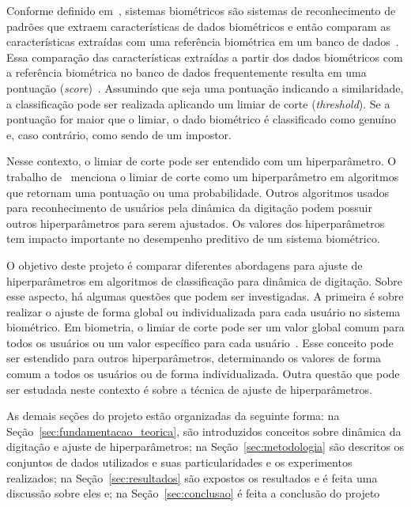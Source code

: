 Conforme definido em~\cite{Jain2004_IntroToBiometrics}, sistemas biométricos são sistemas de reconhecimento de padrões que extraem características de dados biométricos e então comparam as características extraídas com uma referência biométrica em um banco de dados~\cite{Jain2004_IntroToBiometrics}. Essa comparação das características extraídas a partir dos dados biométricos com a referência biométrica no banco de dados frequentemente resulta em uma pontuação (\textit{score})~\cite{Jain2016_50Years}. Assumindo que seja uma pontuação indicando a similaridade, a classificação pode ser realizada aplicando um limiar de corte (\textit{threshold}). Se a pontuação for maior que o limiar, o dado biométrico é classificado como genuíno e, caso contrário, como sendo de um impostor.

Nesse contexto, o limiar de corte pode ser entendido com um hiperparâmetro. O trabalho de~\cite{hpo_foundations_algorithms_and_open_challenges} menciona o limiar de corte como um hiperparâmetro em algoritmos que retornam uma pontuação ou uma probabilidade. Outros algoritmos usados para reconhecimento de usuários pela dinâmica da digitação podem possuir outros hiperparâmetros para serem ajustados. Os valores dos hiperparâmetros tem impacto importante no desempenho preditivo de um sistema biométrico.

O objetivo deste projeto é comparar diferentes abordagens para ajuste de hiperparâmetros em algoritmos de classificação para dinâmica de digitação. Sobre esse aspecto, há algumas questões que podem ser investigadas. A primeira é sobre realizar o ajuste de forma global ou individualizada para cada usuário no sistema biométrico. Em biometria, o limiar de corte pode ser um valor global comum para todos os usuários ou um valor específico para cada usuário~\cite{Giot2011Unconstrained, Mhenni2019DoubleSerial}. Esse conceito pode ser estendido para outros hiperparâmetros, determinando os valores de forma comum a todos os usuários ou de forma individualizada. Outra questão que pode ser estudada neste contexto é sobre a técnica de ajuste de hiperparâmetros.

As demais seções do projeto estão organizadas da seguinte forma: na Seção~\ref{sec:fundamentacao_teorica}, são introduzidos conceitos sobre dinâmica da digitação e ajuste de hiperparâmetros; na Seção~\ref{sec:metodologia} são descritos os conjuntos de dados utilizados e suas particularidades e os experimentos realizados; na Seção~\ref{sec:resultados} são expostos os resultados e é feita uma discussão sobre eles e; na Seção~\ref{sec:conclusao} é feita a conclusão do projeto


